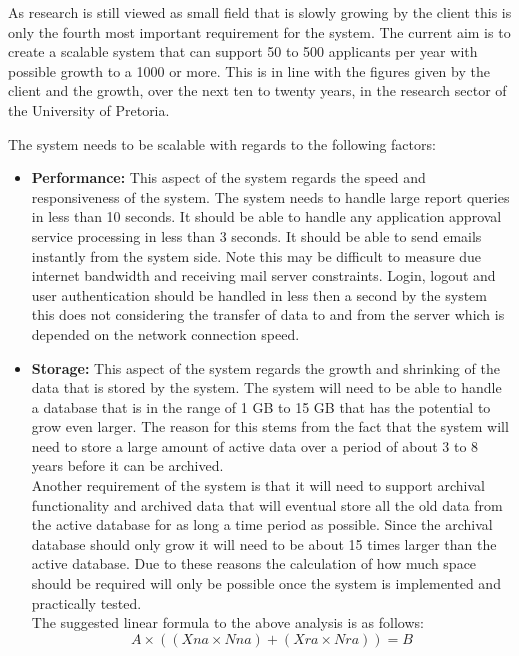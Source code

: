\begin{flushleft}

As research is still viewed as small field that is slowly growing by the client this is only the fourth most important requirement for the system. The current aim is to create a scalable system that can support 50 to 500 applicants per year with possible growth to a 1000 or more. This is in line with the figures given by the client and the growth, over the next ten to twenty years, in the research sector of the University of Pretoria.\\
\vspace{0.05in}

The system needs to be scalable with regards to the following factors:
\begin{itemize}

\item\textbf{Performance:} This aspect of the system regards the speed and responsiveness of the system.
The system needs to handle large report queries in less than 10 seconds. It should be able to handle any application approval service processing in less than 3 seconds. It should be able to send emails instantly from the system side. Note this may be difficult to measure due internet bandwidth and receiving mail server constraints. Login, logout and user authentication should be handled in less then a second by the system this does not  considering the transfer of data to and from the server which is depended on the network connection speed.\\

\item\textbf{Storage:} This aspect of the system regards the growth and shrinking of the data that is stored by the system.
The system will need to be able to handle a database that is in the range of 1 GB to 15 GB that has the potential to grow even larger. The reason for this stems from the fact that the system will need to store a large amount of active data over a period of about 3 to 8 years before it can be archived.
\\Another requirement of the system is that it will need to support archival functionality and archived data that will eventual store all the old data from the active database for as long a time period as possible. Since the archival database should only grow it will need to be about 15 times larger than the active database. Due to these reasons the calculation of how much space should be required will only be possible once the system is implemented and practically tested.\\The suggested linear formula to the above analysis is as follows: 
\begin{equation}
A \times ( (Xna \times Nna) + (Xra \times Nra) ) = B
\end{equation}


\end{itemize}
\end{flushleft}
